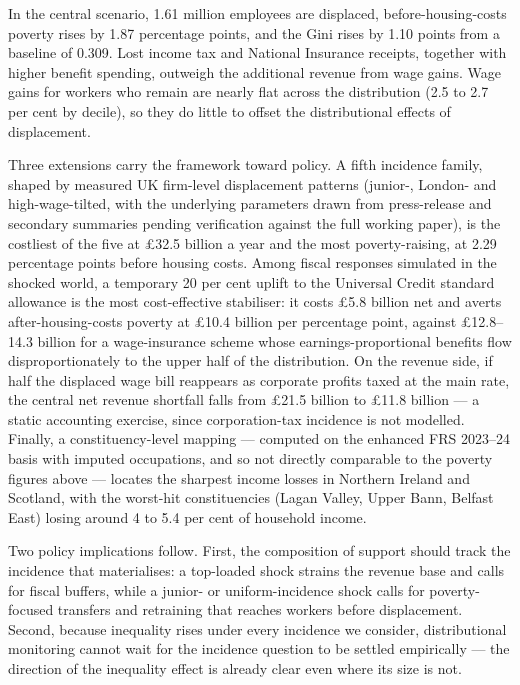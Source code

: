 In the central scenario, 1.61 million employees are displaced, before-housing-costs poverty rises by 1.87 percentage points, and the Gini rises by 1.10 points from a baseline of 0.309. Lost income tax and National Insurance receipts, together with higher benefit spending, outweigh the additional revenue from wage gains. Wage gains for workers who remain are nearly flat across the distribution (2.5 to 2.7 per cent by decile), so they do little to offset the distributional effects of displacement.

Three extensions carry the framework toward policy. A fifth incidence family, shaped by measured UK firm-level displacement patterns (junior-, London- and high-wage-tilted, with the underlying parameters drawn from press-release and secondary summaries pending verification against the full working paper), is the costliest of the five at \pounds 32.5 billion a year and the most poverty-raising, at 2.29 percentage points before housing costs. Among fiscal responses simulated in the shocked world, a temporary 20 per cent uplift to the Universal Credit standard allowance is the most cost-effective stabiliser: it costs \pounds 5.8 billion net and averts after-housing-costs poverty at \pounds 10.4 billion per percentage point, against \pounds 12.8--14.3 billion for a wage-insurance scheme whose earnings-proportional benefits flow disproportionately to the upper half of the distribution. On the revenue side, if half the displaced wage bill reappears as corporate profits taxed at the main rate, the central net revenue shortfall falls from \pounds 21.5 billion to \pounds 11.8 billion --- a static accounting exercise, since corporation-tax incidence is not modelled. Finally, a constituency-level mapping --- computed on the enhanced FRS 2023--24 basis with imputed occupations, and so not directly comparable to the poverty figures above --- locates the sharpest income losses in Northern Ireland and Scotland, with the worst-hit constituencies (Lagan Valley, Upper Bann, Belfast East) losing around 4 to 5.4 per cent of household income.

Two policy implications follow. First, the composition of support should track the incidence that materialises: a top-loaded shock strains the revenue base and calls for fiscal buffers, while a junior- or uniform-incidence shock calls for poverty-focused transfers and retraining that reaches workers before displacement. Second, because inequality rises under every incidence we consider, distributional monitoring cannot wait for the incidence question to be settled empirically --- the direction of the inequality effect is already clear even where its size is not.
